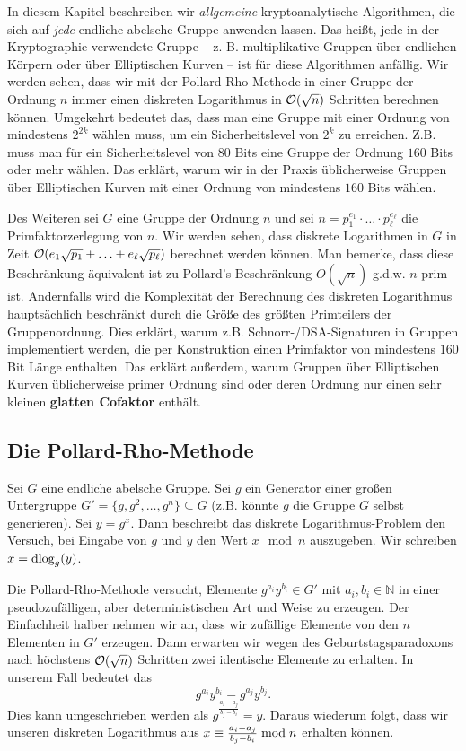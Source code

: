 \begin{refsegment}
In diesem Kapitel beschreiben wir {\em allgemeine} kryptoanalytische Algorithmen, die sich auf {\em jede} endliche abelsche Gruppe anwenden lassen. Das heißt, jede in der Kryptographie verwendete Gruppe -- z. B. multiplikative Gruppen über endlichen Körpern oder über Elliptischen Kurven -- ist für diese Algorithmen anfällig. Wir werden sehen, dass wir mit der Pollard-Rho-Methode in einer Gruppe der Ordnung $n$ immer einen diskreten Logarithmus in ${\cal O}(\sqrt n)$ Schritten berechnen können. Umgekehrt bedeutet das, dass man eine Gruppe mit einer Ordnung von mindestens $2^{2k}$ wählen muss, um ein Sicherheitslevel von $2^{k}$ zu erreichen. Z.B. muss man für ein Sicherheitslevel von $80$ Bits eine Gruppe der Ordnung $160$ Bits oder mehr wählen. Das erklärt, warum wir in der Praxis üblicherweise Gruppen über Elliptischen Kurven mit einer Ordnung von mindestens $160$ Bits wählen.

Des Weiteren sei $G$ eine Gruppe der Ordnung $n$ und sei $n=p_1^{e_1} \cdot \ldots \cdot p_{\ell}^{e_{\ell}}$ die Primfaktorzerlegung von $n$. Wir werden sehen, dass diskrete Logarithmen in $G$ in Zeit ${\cal O}(e_1 \sqrt{p_1} + \ldots + e_{\ell}\sqrt{p_{\ell}})$ berechnet werden können. Man bemerke, dass diese Beschränkung äquivalent ist zu Pollard's Beschränkung $O(\sqrt n)$ g.d.w. $n$ prim ist. Andernfalls wird die Komplexität der Berechnung des diskreten Logarithmus hauptsächlich beschränkt durch die Größe des größten Primteilers der Gruppenordnung. Dies erklärt, warum z.B. Schnorr-/DSA-Signaturen in Gruppen implementiert werden, die per Konstruktion einen Primfaktor von mindestens $160$ Bit Länge enthalten. Das erklärt außerdem, warum Gruppen über Elliptischen Kurven üblicherweise primer Ordnung sind oder deren Ordnung nur einen sehr kleinen \textbf{glatten Cofaktor} enthält.


\subsection{Die Pollard-Rho-Methode}
Sei $G$ eine endliche abelsche Gruppe. Sei $g$ ein Generator einer großen Untergruppe $G' = \{g, g^2, \ldots, g^n\} \subseteq G$ (z.B. könnte $g$ die Gruppe $G$ selbst generieren). Sei $y=g^{x}$. Dann beschreibt das diskrete Logarithmus-Problem den Versuch, bei Eingabe von $g$ und $y$ den Wert $x \mod n$ auszugeben.
Wir schreiben $x=\textrm{dlog}_g(y)$.

Die Pollard-Rho-Methode versucht, Elemente $g^{a_i}y^{b_i} \in G'$ mit $a_i, b_i \in \mathbb{N}$ in einer pseudozufälligen, aber deterministischen Art und Weise zu erzeugen. Der Einfachheit halber nehmen wir an, dass wir zufällige Elemente von den $n$ Elementen in $G'$ erzeugen. Dann erwarten wir wegen des Geburtstagsparadoxons nach höchstens ${\cal O}(\sqrt n)$ Schritten zwei identische Elemente zu erhalten. In unserem Fall bedeutet das
$$
  g^{a_i}y^{b_i} = g^{a_j}y^{b_j}.
$$
Dies kann umgeschrieben werden als $g^{\frac{a_i-a_j}{b_j-b_i}} = y$. Daraus wiederum folgt, dass wir unseren diskreten Logarithmus aus $x \equiv \frac{a_i-a_j}{b_j-b_i} \hspace{1mm}{\rm mod}\hspace{1mm} n$ erhalten können.


\end{refsegment}
